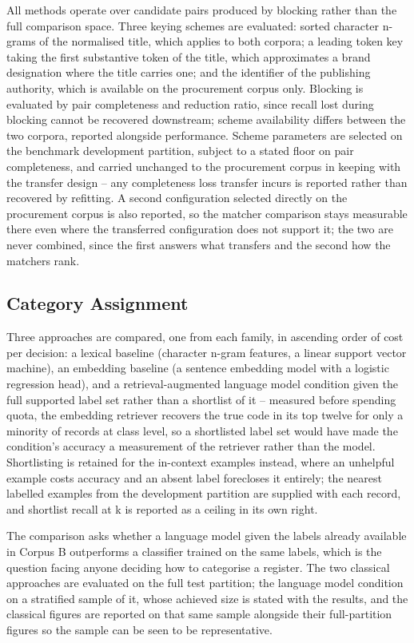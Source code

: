 \documentclass[conference]{IEEEtran}
\begin{document}
All methods operate over candidate pairs produced by blocking rather
than the full comparison space. Three keying schemes are evaluated: sorted
character n-grams of the normalised title, which applies to both corpora;
a leading token key taking the first substantive token of the title,
which approximates a brand designation where the title carries one; and
the identifier of the publishing authority, which is available on the
procurement corpus only. Blocking is evaluated by pair completeness and reduction ratio, since
recall lost during blocking cannot be recovered downstream; scheme
availability differs between the two corpora, reported alongside
performance. Scheme parameters are selected on the benchmark
development partition, subject to a stated floor on pair completeness,
and carried unchanged to the procurement corpus in keeping with the
transfer design -- any completeness loss transfer incurs is reported
rather than recovered by refitting. A second configuration selected
directly on the procurement corpus is also reported, so the matcher
comparison stays measurable there even where the transferred
configuration does not support it; the two are never combined, since
the first answers what transfers and the second how the matchers rank.

\subsection{Category Assignment}

Three approaches are compared, one from each family, in ascending
order of cost per decision: a lexical baseline (character n-gram
features, a linear support vector machine), an embedding baseline (a
sentence embedding model with a logistic regression head), and a
retrieval-augmented language model condition given the full supported
label set rather than a shortlist of it -- measured before spending
quota, the embedding retriever recovers the true code in its top
twelve for only a minority of records at class level, so a
shortlisted label set would have made the condition's accuracy a
measurement of the retriever rather than the model. Shortlisting is
retained for the in-context examples instead, where an unhelpful
example costs accuracy and an absent label forecloses it entirely; the
nearest labelled examples from the development partition are supplied
with each record, and shortlist recall at k is reported as a ceiling
in its own right.

The comparison asks whether a language model given the labels already
available in Corpus B outperforms a classifier trained on the same
labels, which is the question facing anyone deciding how to categorise a
register. The two classical approaches are evaluated on the full test
partition; the language model condition on a stratified sample of it,
whose achieved size is stated with the results, and the classical
figures are reported on that same sample alongside their full-partition
figures so the sample can be seen to be representative.
\end{document}

